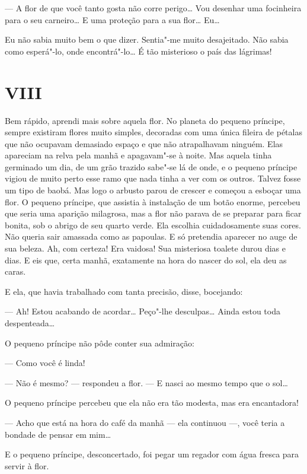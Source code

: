\begin{Parallel}[p]{}{}
{--- A flor de que você tanto gosta não corre perigo\ldots{} Vou desenhar uma
focinheira para o seu carneiro\ldots{} E uma proteção para a sua flor\ldots{}
Eu\ldots{}

Eu não sabia muito bem o que dizer. Sentia"-me muito desajeitado. Não
sabia como esperá"-lo, onde encontrá"-lo\ldots{} É tão misterioso o país das
lágrimas!

\section{VIII}

Bem rápido, aprendi mais sobre aquela flor. No planeta do pequeno
príncipe, sempre existiram flores muito simples, decoradas com uma única
fileira de pétalas que não ocupavam demasiado espaço e que não
atrapalhavam ninguém. Elas apareciam na relva pela manhã e apagavam"-se à
noite. Mas aquela tinha germinado um dia, de um grão trazido sabe"-se lá
de onde, e o pequeno príncipe vigiou de muito perto esse ramo que nada
tinha a ver com os outros. Talvez fosse um tipo de baobá. Mas logo o
arbusto parou de crescer e começou a esboçar uma flor. O pequeno
príncipe, que assistia à instalação de um botão enorme, percebeu que
seria uma aparição milagrosa, mas a flor não parava de se preparar para
ficar bonita, sob o abrigo de seu quarto verde. Ela escolhia
cuidadosamente suas cores. Não queria sair amassada como as papoulas. E
só pretendia aparecer no auge de sua beleza. Ah, com certeza! Era
vaidosa! Sua misteriosa toalete durou dias e dias. E eis que, certa
manhã, exatamente na hora do nascer do sol, ela deu as caras.

E ela, que havia trabalhado com tanta precisão, disse, bocejando:

--- Ah! Estou acabando de acordar\ldots{} Peço"-lhe desculpas\ldots{} Ainda estou
toda despenteada\ldots{}

O pequeno príncipe não pôde conter sua admiração:

--- Como você é linda!

--- Não é mesmo? --- respondeu a flor. --- E nasci ao mesmo tempo que o
sol\ldots{}

O pequeno príncipe percebeu que ela não era tão modesta, mas era
encantadora!

--- Acho que está na hora do café da manhã --- ela continuou ---, você teria
a bondade de pensar em mim\ldots{}

E o pequeno príncipe, desconcertado, foi pegar um regador com água
fresca para servir à flor.

}
\end{Parallel}
